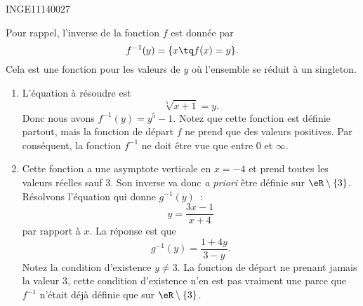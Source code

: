 

\begin{corrige}{INGE11140027}

	Pour rappel, l'inverse de la fonction $f$ est donnée par
	\begin{equation}
		f^{-1}(y)=\{ x\tq f(x)=y \}.
	\end{equation}
	Cela est une fonction pour les valeurs de $y$ où l'ensemble se réduit à un singleton.

	\begin{enumerate}

		\item
			L'équation à résoudre est
			\begin{equation}
				\sqrt[5]{x+1}=y.
			\end{equation}
			Donc nous avons $f^{-1}(y)=y^5-1$. Notez que cette fonction est définie partout, mais la fonction de départ $f$ ne prend que des valeurs positives. Par conséquent, la fonction $f^{-1}$ ne doit être vue que entre $0$ et $\infty$.

		\item
			Cette fonction a une asymptote verticale en $x=-4$ et prend toutes les valeurs réelles sauf $3$. Son inverse va donc \emph{a priori} être définie sur $\eR\setminus\{ 3 \}$. Résolvons l'équation qui donne $g^{-1}(y)$~:
			\begin{equation}
				y=\frac{ 3x-1 }{ x+4 }
			\end{equation}
			par rapport à $x$. La réponse est que
			\begin{equation}
				g^{-1}(y)=\frac{ 1+4y }{ 3-y }.
			\end{equation}
			Notez la condition d'existence $y\neq 3$. La fonction de départ ne prenant jamais la valeur $3$, cette condition d'existence n'en est pas vraiment une parce que $f^{-1}$ n'était déjà définie que sur $\eR\setminus\{ 3 \}$.	

	\end{enumerate}
	

\end{corrige}
